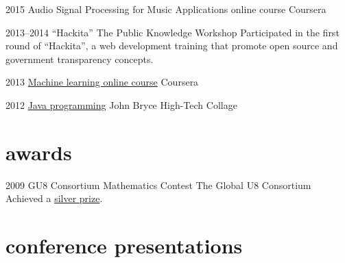 \documentclass[]{friggeri-cv}  %
\begin{document}
\begin{entrylist}

    \entry
    {2015}
    {Audio Signal Processing for Music Applications online course}
    {Coursera}

\end{entrylist}
\begin{entrylist}

    \entry
    {2013--2014}
    {“Hackita”}
    {The Public Knowledge Workshop}
    {Participated in the first round of ``Hackita'', a web development training that promote open source and government transparency concepts.}

\end{entrylist}
\begin{entrylist}

    \entry
    {2013}
    {\href{http://db.tt/hcPmtUpn}{Machine learning online course}}
    {Coursera}

\end{entrylist}
\begin{entrylist}

    \entry
    {2012}
    {\href{http://db.tt/g3VdmoOu}{Java programming}}
    {John Bryce High-Tech Collage}

\end{entrylist}


\section{awards}

\begin{entrylist}

    \entry
    {2009}
    {GU8 Consortium Mathematics Contest}
    {The Global U8 Consortium}
    {Achieved a \href{http://db.tt/7b5BuXmT}{silver prize}.}

\end{entrylist}


\section{conference presentations}
\end{document}
